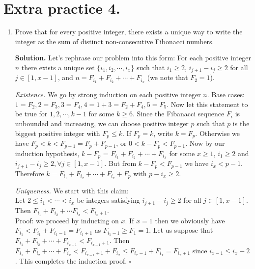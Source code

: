 \documentclass[11pt]{article}
\begin{document}
\section {Extra practice 4.}
\begin{enumerate}
\item Prove that for every positive integer, there exists a unique way to write the integer as the sum of distinct non-consecutive Fibonacci numbers.

\textbf{Solution.} 
Let's rephrase our problem into this form: For each positive integer $n$ there exists a unique set $\{i_1, i_2,\cdots ,i_x\}$ such that $i_1\ge 2$, $i_{j+1}-i_j\ge 2$ for all $j\in [1, x-1]$, and $n= F_{i_1}+F_{i_2}+\cdots +F_{i_x}$ (we note that $F_2=1$).

\emph {Existence.}
We go by strong induction on each positive integer $n$. Base cases: $1= F_2,2=F_3,3=F_4,4=1+3=F_2+F_4,5=F_5$. Now let this statement to be true for $1,2,\cdots , k-1$ for some $k\ge 6$. Since the Fibanacci sequence $F_i$ is unbounded and increasing, we can choose positive integer $p$ such that $p$ is the biggest positive integer with $F_p\le k.$ If $F_p=k$, write $k=F_p$. Otherwise we have $F_p<k<F_{p+1}=F_p+F_{p-1}$, or $0<k-F_{p}<F_{p-1}$. Now by our induction hypothesis, $k-F_{p}$ = $F_{i_1}+F_{i_2}+\cdots+ F_{i_x}$ for some $x\ge 1$, $i_1\ge 2$ and $i_{j+1}-i_j\ge 2, \forall j\in [1,x-1]$. But from $k-F_p<F_{p-1}$ we have $i_x<p-1$. Therefore $k=F_{i_1}+F_{i_2}+\cdots +F_{i_x}+F_p$ with $p-i_x\ge 2$.

\emph {Uniqueness.} We start with this claim:\\
Let $2\le i_1<\cdots <i_x$ be integers satisfying $i_{j+1}-i_j\ge 2$ for all $j\in [1,x-1].$ Then $F_{i_1}+F_{i_2}+\cdots F_{i_x}<F_{i_{x}+1}$.\\
Proof: we proceed by inducting on $x$. If $x=1$ then we obviously have $F_{i_1}<F_{i_1}+F_{i_1-1}=F_{i_1+1}$ as $F_{i_1-1}\ge F_1=1$. Let us suppose that $F_{i_1}+F_{i_2}+\cdots +F_{i_{x-1}}<F_{i_{x-1}+1}$. Then $F_{i_1}+F_{i_2}+\cdots + F_{i_x}<F_{i_{x-1}+1}+F_{i_x}\le F_{i_{x}-1}+F_{i_x}=F_{i_{x}+1}$ since $i_{x-1}\le i_x-2$. This completes the induction proof. $\square$


\end{enumerate}
\end{document}
